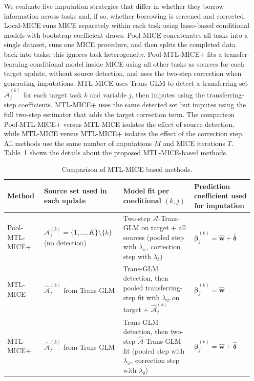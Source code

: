 \documentclass[12pt]{article}
\begin{document}
We evaluate five imputation strategies that differ in whether they borrow information across tasks and, if so, whether borrowing is screened and corrected. Local-MICE runs MICE separately within each task using lasso-based conditional models with bootstrap coefficient draws. Pool-MICE concatenates all tasks into a single dataset, runs one MICE procedure, and then splits the completed data back into tasks; this ignores task heterogeneity. Pool-MTL-MICE+ fits a transfer-learning conditional model inside MICE using all other tasks as sources for each target update, without source detection, and uses the two-step correction when generating imputations. MTL-MICE uses Trans-GLM to detect a transferring set $\widehat{\mathcal{A}}^{(k)}_j$ for each target task $k$ and variable $j$, then imputes using the transferring-step coefficients. MTL-MICE+ uses the same detected set but imputes using the full two-step estimator that adds the target correction term. The comparison Pool-MTL-MICE+ versus MTL-MICE isolates the effect of source detection, while MTL-MICE versus MTL-MICE+ isolates the effect of the correction step. All methods use the same number of imputations $M$ and MICE iterations $T$. Table~\ref{tab:mtl_mice_methods} shows the details about the proposed MTL-MICE-based methods.

\begin{table}[t]
\centering
\footnotesize
\caption{Comparison of MTL-MICE based methods.}
\label{tab:mtl_mice_methods}
\begin{tabular}{p{3.1cm} p{3.0cm} p{3.8cm} p{4.1cm}}
\hline
Method & Source set used in each update & Model fit per conditional $(k,j)$ & Prediction coefficient used for imputation \\
\hline
Pool-MTL-MICE+ &
$\mathcal{A}^{(k)}_j=\{1,\dots,K\}\setminus\{k\}$ (no detection) &
Two-step $\mathcal{A}$-Trans-GLM on target + all sources (pooled step with $\lambda_w$, correction step with $\lambda_\delta$) &
$\hat{\bm{\beta}}^{(k)}_j=\hat{\bm{w}}+\hat{\bm{\delta}}$ \\
\hline
MTL-MICE &
$\widehat{\mathcal{A}}^{(k)}_j$ from Trans-GLM &
Trans-GLM detection, then pooled transferring-step fit with $\lambda_w$ on target + $\widehat{\mathcal{A}}^{(k)}_j$ &
$\hat{\bm{\beta}}^{(k)}_j=\hat{\bm{w}}$ \\
\hline
MTL-MICE+ &
$\widehat{\mathcal{A}}^{(k)}_j$ from Trans-GLM &
Trans-GLM detection, then two-step $\widehat{\mathcal{A}}$-Trans-GLM fit (pooled step with $\lambda_w$, correction step with $\lambda_\delta$) &
$\hat{\bm{\beta}}^{(k)}_j=\hat{\bm{w}}+\hat{\bm{\delta}}$ \\
\hline
\end{tabular}
\end{table}
\end{document}
